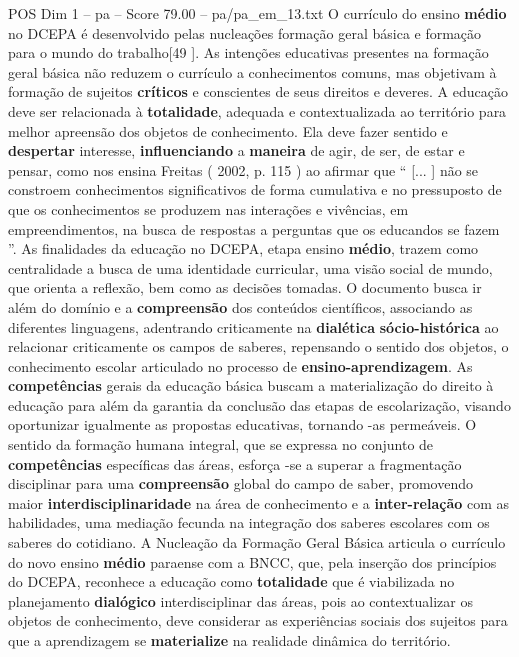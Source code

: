 \begin{textsample}{POS Dim 1 – pa – Score 79.00 – pa/pa\_em\_13.txt}
O currículo do ensino \textbf{médio} no DCEPA é desenvolvido pelas nucleações formação geral básica e formação para o mundo do trabalho[49 ].
As intenções educativas presentes na formação geral básica não reduzem o currículo a conhecimentos comuns, mas objetivam à formação de sujeitos \textbf{críticos} e conscientes de seus direitos e deveres.
A educação deve ser relacionada à \textbf{totalidade}, adequada e contextualizada ao território para melhor apreensão dos objetos de conhecimento.
Ela deve fazer sentido e \textbf{despertar} interesse, \textbf{influenciando} a \textbf{maneira} de agir, de ser, de estar e pensar, como nos ensina Freitas ( 2002, p. 115 ) ao afirmar que “ [... ] não se constroem conhecimentos significativos de forma cumulativa e no pressuposto de que os conhecimentos se produzem nas interações e vivências, em empreendimentos, na busca de respostas a perguntas que os educandos se fazem ”.
As finalidades da educação no DCEPA, etapa ensino \textbf{médio}, trazem como centralidade a busca de uma identidade curricular, uma visão social de mundo, que orienta a reflexão, bem como as decisões tomadas.
O documento busca ir além do domínio e a \textbf{compreensão} dos conteúdos científicos, associando as diferentes linguagens, adentrando criticamente na \textbf{dialética} \textbf{sócio-histórica} ao relacionar criticamente os campos de saberes, repensando o sentido dos objetos, o conhecimento escolar articulado no processo de \textbf{ensino-aprendizagem}.
As \textbf{competências} gerais da educação básica buscam a materialização do direito à educação para além da garantia da conclusão das etapas de escolarização, visando oportunizar igualmente as propostas educativas, tornando -as permeáveis.
O sentido da formação humana integral, que se expressa no conjunto de \textbf{competências} específicas das áreas, esforça -se a superar a fragmentação disciplinar para uma \textbf{compreensão} global do campo de saber, promovendo maior \textbf{interdisciplinaridade} na área de conhecimento e a \textbf{inter-relação} com as habilidades, uma mediação fecunda na integração dos saberes escolares com os saberes do cotidiano.
A Nucleação da Formação Geral Básica articula o currículo do novo ensino \textbf{médio} paraense com a BNCC, que, pela inserção dos princípios do DCEPA, reconhece a educação como \textbf{totalidade} que é viabilizada no planejamento \textbf{dialógico} interdisciplinar das áreas, pois ao contextualizar os objetos de conhecimento, deve considerar as experiências sociais dos sujeitos para que a aprendizagem se \textbf{materialize} na realidade dinâmica do território.

\end{textsample}
